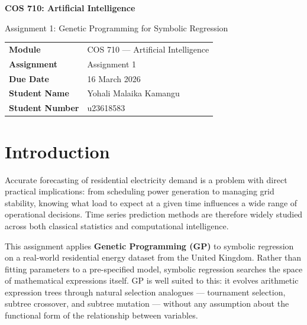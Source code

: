\documentclass[12pt,a4paper]{article}
\begin{document}
\begin{titlepage}
    \centering
    \vspace*{2cm}
    {\LARGE\bfseries COS 710: Artificial Intelligence\par}
    \vspace{0.5cm}
    {\Large Assignment 1: Genetic Programming for Symbolic Regression\par}
    \vspace{2cm}
    \begin{tabular}{ll}
        \textbf{Module}         & COS 710 --- Artificial Intelligence \\[4pt]
        \textbf{Assignment}     & Assignment 1 \\[4pt]
        \textbf{Due Date}       & 16 March 2026 \\[4pt]
        \textbf{Student Name}   & Yohali Malaika Kamangu \\[4pt]
        \textbf{Student Number} & u23618583 \\
    \end{tabular}
    \vfill
\end{titlepage}

\tableofcontents
\newpage

\section*{Introduction}

Accurate forecasting of residential electricity demand is a problem with direct practical implications: from scheduling power generation to managing grid stability, knowing what load to expect at a given time influences a wide range of operational decisions. Time series prediction methods are therefore widely studied across both classical statistics and computational intelligence.

This assignment applies \textbf{Genetic Programming (GP)} to symbolic regression on a real-world residential energy dataset from the United Kingdom. Rather than fitting parameters to a pre-specified model, symbolic regression searches the space of mathematical expressions itself. GP is well suited to this: it evolves arithmetic expression trees through natural selection analogues --- tournament selection, subtree crossover, and subtree mutation --- without any assumption about the functional form of the relationship between variables.
\end{document}
